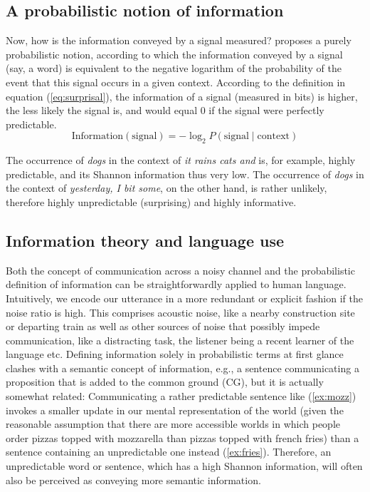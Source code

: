 \documentclass[output=paper,colorlinks,citecolor=brown]{langscibook}
\begin{document}
\subsection{A probabilistic notion of information}
Now, how is the information conveyed by a signal measured? \citeauthor{shannon1948} proposes a purely probabilistic notion, according to which the information conveyed by a signal (say, a word) is equivalent to the negative logarithm of the probability of the event that this signal occurs in a given context. According to the definition in equation (\ref{eq:surprisal}), the information of a signal (measured in bits) is higher, the less likely the signal is, and would equal $0$ if the signal were perfectly predictable.  
\begin{equation}
    \text{Information}(\text{signal}) = -\log_2 P(\text{signal}\mathrel{|}\text{context}) \label{eq:surprisal}
\end{equation}

The occurrence of \textit{dogs} in the context of \textit{it rains cats and} is, for example, highly predictable, and its Shannon information thus very low. The occurrence of \textit{dogs} in the context of \textit{yesterday, I bit some}, on the other hand, is rather unlikely, therefore highly unpredictable (surprising) and highly informative.

\subsection{Information theory and language use}
Both the concept of communication across a noisy channel and the probabilistic definition of information can be straightforwardly applied to human language. Intuitively, we encode our utterance in a more redundant or explicit fashion if the noise ratio is high. This comprises acoustic noise, like a nearby construction site or departing train as well as other sources of noise that possibly impede communication, like a distracting task, the listener being a recent learner of the language etc.
Defining information solely in probabilistic terms at first glance clashes with a semantic concept of information, e.g., a sentence communicating a proposition that is added to the common ground (CG), but it is actually somewhat related: Communicating a rather predictable sentence like (\ref{ex:mozz}) invokes a smaller update in our mental representation of the world (given the reasonable assumption that there are more accessible worlds in which people order pizzas topped with mozzarella than pizzas topped with french fries) than a sentence containing an unpredictable one instead (\ref{ex:fries}). Therefore, an unpredictable word or sentence, which has a high Shannon information, will often also be perceived as conveying more semantic information. %
\end{document}
